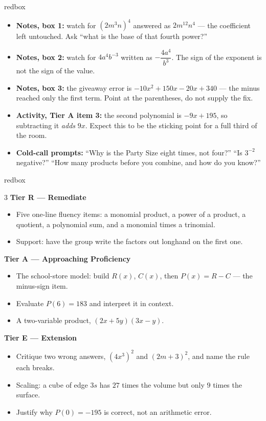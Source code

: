 \documentclass[10pt]{article}
\begin{document}
\begin{skillbox}{redbox}
\begin{itemize}[leftmargin=1.2em, itemsep=2pt, topsep=2pt]
  \item \textbf{Notes, box 1:} watch for $(2m^3n)^4$ answered as $2m^{12}n^4$ --- the coefficient
        left untouched. Ask ``what is the base of that fourth power?''
  \item \textbf{Notes, box 2:} watch for $4a^4b^{-3}$ written as $-\dfrac{4a^4}{b^3}$. The sign of
        the exponent is not the sign of the value.
  \item \textbf{Notes, box 3:} the giveaway error is $-10x^2+150x-20x+340$ --- the minus reached
        only the first term. Point at the parentheses, do not supply the fix.
  \item \textbf{Activity, Tier A item 3:} the second polynomial is $-9x+195$, so subtracting it
        \emph{adds} $9x$. Expect this to be the sticking point for a full third of the room.
  \item \textbf{Cold-call prompts:} ``Why is the Party Size eight times, not four?'' ``Is $3^{-2}$
        negative?'' ``How many products before you combine, and how do you know?''
\end{itemize}
\end{skillbox}

\boxguard
\begin{skillbox}{redbox}
\begin{multicols}{3}
\textbf{Tier R --- Remediate}
\begin{itemize}[leftmargin=1em, itemsep=1pt, topsep=2pt]
  \item Five one-line fluency items: a monomial product, a power of a product, a quotient, a
        polynomial sum, and a monomial times a trinomial.
  \item Support: have the group write the factors out longhand on the first one.
\end{itemize}

\columnbreak
\textbf{Tier A --- Approaching Proficiency}
\begin{itemize}[leftmargin=1em, itemsep=1pt, topsep=2pt]
  \item The school-store model: build $R(x)$, $C(x)$, then $P(x)=R-C$ --- the minus-sign item.
  \item Evaluate $P(6)=183$ and interpret it in context.
  \item A two-variable product, $(2x+5y)(3x-y)$.
\end{itemize}

\columnbreak
\textbf{Tier E --- Extension}
\begin{itemize}[leftmargin=1em, itemsep=1pt, topsep=2pt]
  \item Critique two wrong answers, $(4x^3)^2$ and $(2m+3)^2$, and name the rule each breaks.
  \item Scaling: a cube of edge $3s$ has $27$ times the volume but only $9$ times the surface.
  \item Justify why $P(0)=-195$ is correct, not an arithmetic error.
\end{itemize}
\end{multicols}
\end{skillbox}
\end{document}
